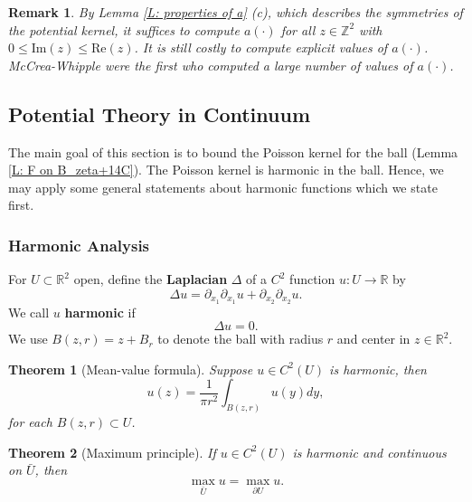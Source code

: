\documentclass[11pt]{article}
\numberwithin{equation}{section}
\def\mydot{\boldsymbol{\cdot}}
\newtheorem{theorem}{Theorem}
\newtheorem*{remark}{Remark}
\begin{document}
\begin{remark}
  By Lemma \ref{L: properties of a} (c), which 
  describes the symmetries of the potential kernel,
  it suffices to compute $a(\mydot)$ for all $z \in \mathbb{Z}^2$ with 
  $0 \leq \text{Im}(z) \leq \text{Re}(z)$. 
  It is still 
  costly to compute explicit values of $a(\mydot)$. 
  McCrea-Whipple \cite{mccrea_whipple_1940} 
  were the first who computed a large number of values of $a(\mydot)$.
\end{remark}

\subsection{Potential Theory in Continuum}
The main goal of this section is to bound the 
Poisson kernel for the ball (Lemma \ref{L: F on B_zeta+14C}). 
The Poisson kernel is harmonic in the ball. 
Hence, we may apply some general statements 
about harmonic functions which we state first.  

\subsubsection{Harmonic Analysis}
For $U \subset \mathbb{R}^2$ open, 
define the \textbf{Laplacian} $\Delta$  of a $C^2$ function 
$u : U \rightarrow \mathbb{R}$ by 
\begin{equation}\nonumber
  \label{D: cont laplacian}
  \Delta u = \partial_{x_1} \partial_{x_1} u + \partial_{x_2} \partial_{x_2} u. 
\end{equation} 
We call $u$ \textbf{harmonic} if 
\begin{equation}\nonumber
  \Delta u = 0.
\end{equation}
We use $B(z,r) = z + B_r \label{D: B(z,r)}$ to denote the ball 
with radius $r$ and center in $z \in \mathbb{R}^2$.
 

\begin{theorem}[Mean-value formula]
  \label{T: Mean-Value Formula}
  Suppose $u \in C^2(U)$ is harmonic, then 
  \begin{equation}\nonumber
    u(z) = \frac{1}{\pi r^2} \int_{B(z, r)} u(y) dy, 
  \end{equation}
  for each $B(z, r) \subset U$.
\end{theorem}

\begin{theorem}[Maximum principle]
  \label{T: maximum principle}
  If $u \in C^2(U)$ is harmonic and continuous 
  on $\bar{U}$, then 
  \begin{equation}\nonumber
    \max_{\bar{U}} u = \max_{\partial U} u.
  \end{equation}
\end{theorem}
\end{document}
